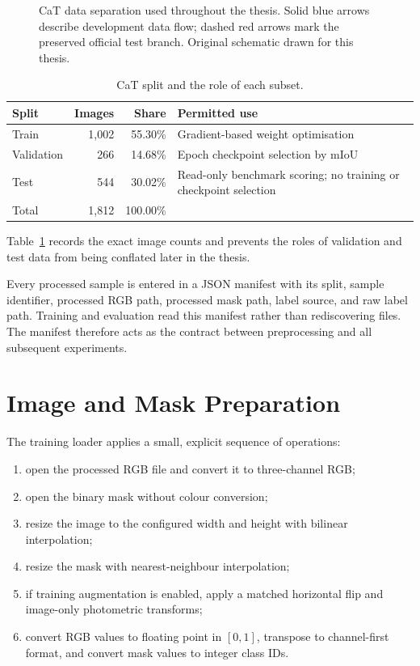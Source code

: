 \begin{figure}[H]
\centering
\resizebox{0.94\textwidth}{!}{}
\caption[CaT train, validation, and test separation.]{CaT data separation used
throughout the thesis. Solid blue arrows describe development data flow; dashed
red arrows mark the preserved official test branch. Original schematic drawn
for this thesis.}
\label{fig:cat_data_partition}
\end{figure}

\begin{table}[H]
\centering
\caption{CaT split and the role of each subset.}
\label{tab:final_split}
\begin{tabularx}{\textwidth}{@{}lrrX@{}}
\toprule
\textbf{Split} & \textbf{Images} & \textbf{Share} & \textbf{Permitted use} \\
\midrule
Train & 1,002 & 55.30\% & Gradient-based weight optimisation \\
Validation & 266 & 14.68\% & Epoch checkpoint selection by mIoU \\
Test & 544 & 30.02\% & Read-only benchmark scoring; no training or checkpoint selection \\
\midrule
Total & 1,812 & 100.00\% & \\
\bottomrule
\end{tabularx}
\end{table}

Table~\ref{tab:final_split} records the exact image counts and prevents the
roles of validation and test data from being conflated later in the thesis.

Every processed sample is entered in a JSON manifest with its split, sample
identifier, processed RGB path, processed mask path, label source, and raw
label path. Training and evaluation read this manifest rather than rediscovering
files. The manifest therefore acts as the contract between preprocessing and
all subsequent experiments.

\section{Image and Mask Preparation}

The training loader applies a small, explicit sequence of operations:
\begin{enumerate}
  \item open the processed RGB file and convert it to three-channel RGB;
  \item open the binary mask without colour conversion;
  \item resize the image to the configured width and height with bilinear
  interpolation;
  \item resize the mask with nearest-neighbour interpolation;
  \item if training augmentation is enabled, apply a matched horizontal flip
  and image-only photometric transforms;
  \item convert RGB values to floating point in $[0,1]$, transpose to
  channel-first format, and convert mask values to integer class IDs.
\end{enumerate}

